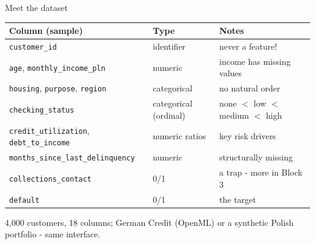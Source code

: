 \documentclass[10pt,aspectratio=169]{beamer}
\begin{document}
\begin{frame}{Meet the dataset}
  \footnotesize
  \begin{center}
  \begin{tabular}{@{}lll@{}}
    \toprule
    Column (sample) & Type & Notes \\
    \midrule
    \texttt{customer\_id} & identifier & never a feature! \\
    \texttt{age}, \texttt{monthly\_income\_pln} & numeric & income has missing values \\
    \texttt{housing}, \texttt{purpose}, \texttt{region} & categorical & no natural order \\
    \texttt{checking\_status} & categorical (ordinal) & none $<$ low $<$ medium $<$ high \\
    \texttt{credit\_utilization}, \texttt{debt\_to\_income} & numeric ratios & key risk drivers \\
    \texttt{months\_since\_last\_delinquency} & numeric & \alert{structurally missing} \\
    \texttt{collections\_contact} & 0/1 & \alert{a trap} - more in Block 3 \\
    \texttt{default} & 0/1 & the target \\
    \bottomrule
  \end{tabular}
  \end{center}
  \vspace{0.4em}
  \begin{center}\small 4{,}000 customers, 18 columns; German Credit (OpenML) or a
  synthetic Polish portfolio - same interface.\end{center}
\end{frame}
\end{document}
